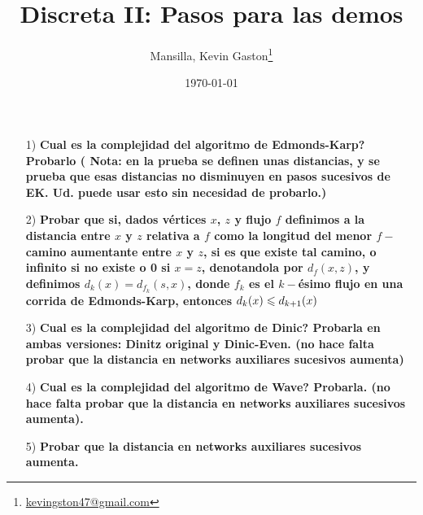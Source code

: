 \documentclass[12pt,a4paper]{article}
\author{Mansilla, Kevin Gaston\footnote{\href{mailto:kevingston47@gmail.com}{kevingston47@gmail.com}}}
\title{Discreta II: Pasos para las demos}
\date{\today}
\begin{document}
\maketitle{}

\begin{itemize}
    \item [1)] \textbf{Cual es la complejidad del algoritmo de Edmonds-Karp? Probarlo (
        Nota: en la prueba se definen unas distancias, y se prueba que esas 
        distancias no disminuyen en pasos sucesivos de EK. Ud. puede usar esto 
        sin necesidad de probarlo.)}
        \label{dem:EK}
\end{itemize}

\begin{itemize}
    \item [2)] \textbf{Probar que si, dados vértices $x$, $z$ y flujo $f$ definimos a la distancia 
    entre $x$ y $z$ relativa a $f$ como la longitud del menor $f-$camino aumentante 
    entre $x$ y $z$, si es que existe tal camino, o infinito si no existe o 0 
    si $x = z$, denotandola por $d_{f} (x, z)$, y definimos 
    $d_{k}(x) = d_{f_{k}} (s, x)$, donde $f_{k}$ es el $k-$ésimo flujo en una 
    corrida de Edmonds-Karp, entonces $d_{k}(x) \leqslant d_{k+1}(x)$}
    \label{dem:dist}
\end{itemize}

\begin{itemize}
    \item [3)] \textbf{Cual es la complejidad del algoritmo de Dinic? Probarla en ambas 
    versiones: Dinitz original y Dinic-Even. (no hace falta probar que la distancia 
    en networks auxiliares sucesivos aumenta)}
    \label{dem:Dinic}
\end{itemize}

\begin{itemize}
    \item [4)] \textbf{Cual es la complejidad del algoritmo de Wave? Probarla. (no hace falta 
    probar que la distancia en networks auxiliares sucesivos aumenta).}
    \label{dem:Wave}
\end{itemize}

\begin{itemize}
    \item [5)] \textbf{Probar que la distancia en networks auxiliares sucesivos aumenta.}
    \label{dem:dist2}
\end{itemize}
\end{document}

